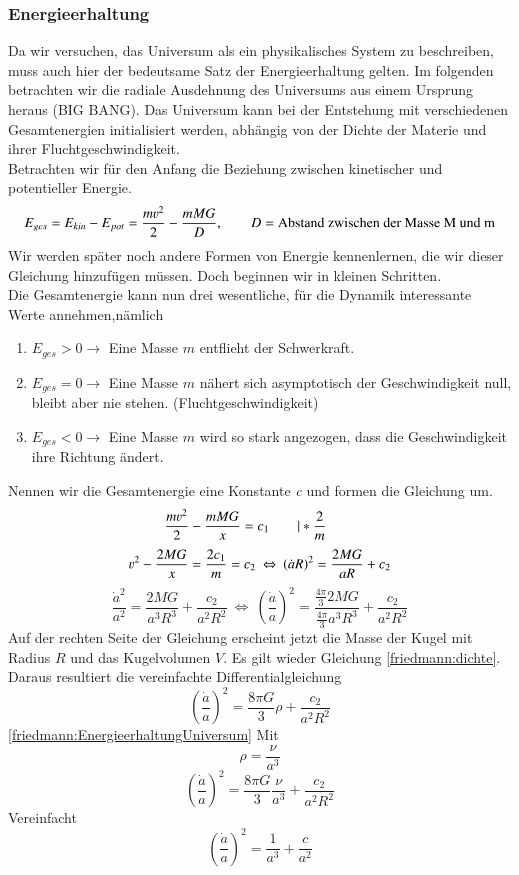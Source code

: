 \begin{refsection}
\subsubsection{Energieerhaltung}
Da wir versuchen, das Universum als ein physikalisches System zu beschreiben, muss auch hier der bedeutsame Satz der Energieerhaltung gelten. Im folgenden betrachten wir die radiale Ausdehnung des Universums aus einem Ursprung heraus (BIG BANG). Das Universum kann bei der Entstehung mit verschiedenen Gesamtenergien initialisiert werden, abhängig von der Dichte der Materie und ihrer Fluchtgeschwindigkeit.\\
Betrachten wir für den Anfang die Beziehung zwischen kinetischer und potentieller Energie.
\begin{equation}
E_{ges} = E_{kin} - E_{pot} =  \frac{m \varv^2}{2} - \frac{m M G }{D}, \qquad D = \text{Abstand zwischen der Masse M und m}
\end{equation}
Wir werden später noch andere Formen von Energie kennenlernen, die wir dieser Gleichung hinzufügen müssen. Doch beginnen wir in kleinen Schritten.\\
Die Gesamtenergie kann nun drei wesentliche, für die Dynamik interessante Werte annehmen,nämlich
\begin{enumerate}
	\item $E_{ges} > 0 \rightarrow$ Eine Masse $m$ entflieht der Schwerkraft.
	\item $E_{ges} = 0 \rightarrow$ Eine Masse $m$ nähert sich asymptotisch  der Geschwindigkeit null, bleibt aber nie stehen. (Fluchtgeschwindigkeit)
	\item $E_{ges} < 0 \rightarrow$ Eine Masse $m$ wird so stark angezogen, dass die Geschwindigkeit ihre Richtung ändert.
\end{enumerate}
Nennen wir die Gesamtenergie eine Konstante \textit{c} und formen die Gleichung um.
\[\frac{m \varv^2}{2} - \frac{m M G}{x} = c_1 \qquad| *\frac{2}{m} \qquad \]
\[{\varv^2} - \frac{2 M G}{x} = \frac{2c_1}{m} = c_2
\:  \Leftrightarrow \: \left( \dot{a} R\right)^2 = \frac{2 M G}{a R} + c_2\] 
\[\frac{\dot{a}^2}{a^2} = \frac{2 M G}{a^3 R^3} + \frac{c_2}{a^2 R^2} \: \Leftrightarrow \: \left(\frac{\dot{a}}{a} \right)^2 = \frac{\frac{4 \pi}{3}2 M G}{\frac{4 \pi}{3} a^3 R^3} + \frac{c_2}{a^2 R^2} \] %
Auf der rechten Seite der Gleichung erscheint jetzt die Masse der Kugel mit Radius $R$ und das Kugelvolumen $V$. Es gilt wieder Gleichung \ref{friedmann:dichte}. Daraus resultiert die vereinfachte Differentialgleichung 
\begin{equation}
\left(\frac{\dot{a}}{a} \right)^2 = \frac{8 \pi G}{3} \rho + \frac{c_2}{a^2 R^2}
\label{friedmann:EnergieerhaltungUniversum}
\end{equation}
\ref{friedmann:EnergieerhaltungUniversum}
Mit \[\rho = \frac{\nu}{a^3}\]
\[
\left(\frac{\dot{a}}{a} \right)^2 = \frac{8 \pi G}{3} \frac{\nu}{a^3} + \frac{c_2}{a^2 R^2}
\]
Vereinfacht
\begin{equation}
\left(\frac{\dot{a}}{a} \right)^2 = \frac{1}{a^3} + \frac{c}{a^2}
\end{equation}


\end{refsection}
